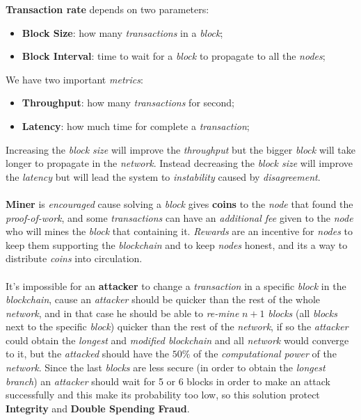 \documentclass{article}
\begin{document}
\textbf{Transaction rate} depends on two parameters: 
\begin{itemize}
\item \textbf{Block Size}: how many \emph{transactions} in a \emph{block};
\item\textbf{ Block Interval}: time to wait for a \emph{block} to propagate to all the \emph{nodes};
\end{itemize}
We have two important \emph{metrics}:
\begin{itemize}
\item \textbf{Throughput}: how many \emph{transactions} for second;
\item \textbf{Latency}: how much time for complete a \emph{transaction};
\end{itemize}
Increasing the \emph{block size} will improve the \emph{throughput} but the bigger \emph{block} will take longer to propagate in the \emph{network}. Instead decreasing the \emph{block size} will improve the \emph{latency} but will lead the system to \emph{instability} caused by \emph{disagreement}. \\\\
\textbf{Miner} is \emph{encouraged} cause solving a \emph{block} gives \textbf{coins} to the \emph{node} that found the \emph{proof-of-work}, and some \emph{transactions} can have an \emph{additional fee} given to the \emph{node} who will mines the \emph{block} that containing it. \emph{Rewards} are an incentive for \emph{nodes} to keep them supporting the \emph{blockchain} and to keep \emph{nodes} honest, and its a way to distribute \emph{coins} into circulation. \\\\
It's impossible for an \textbf{attacker} to change a \emph{transaction} in a specific \emph{block} in the \emph{blockchain}, cause an \emph{attacker} should be quicker than the rest of the whole \emph{network}, and in that case he should be able to \emph{re-mine} $n+1$ \emph{blocks} (all \emph{blocks} next to the specific \emph{block}) quicker than the rest of the \emph{network}, if so the \emph{attacker} could obtain the \emph{longest} and \emph{modified blockchain} and all \emph{network} would converge to it, but the \emph{attacked} should have the $50\%$ of the \emph{computational power} of the \emph{network}. Since the last \emph{blocks} are less secure (in order to obtain the \emph{longest branch}) an \emph{attacker} should wait for 5 or 6 blocks in order to make an attack successfully and this make its probability too low, so this solution protect \textbf{Integrity} and \textbf{Double Spending Fraud}. \\\\
\end{document}
